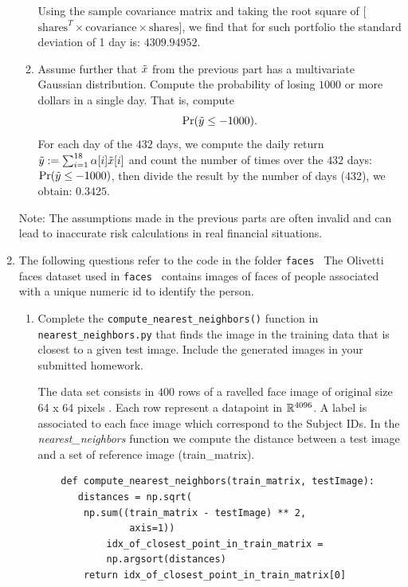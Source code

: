 \documentclass[12pt,twoside]{article}
\begin{document}
\begin{enumerate}
\begin{enumerate}
    Using the sample covariance matrix and taking the root square of [$ \text{shares}^T \times \text{covariance} \times \text{shares}$], we find that for such portfolio the standard deviation of 1 day is: $4309.94952$.
    
  \item Assume further that $\tilde{  x }$ from the previous part has a
    multivariate Gaussian distribution.  Compute the probability
    of losing $1000$ or more dollars in a single day.  That is,
    compute
    $$\Pr(\tilde{  y } \leq -1000).$$
    For each day of the $432$ days, we compute the daily return $\tilde{  y } := \sum_{i=1}^{18} \alpha[i] \tilde{  x }[i]$ and count the number of times over the $432$ days: $\Pr(\tilde{  y } \leq -1000)$, then divide the result by the number of days (432),
    we obtain: $0.3425$.
    
  \end{enumerate}
  Note: The assumptions made in the previous parts are often
  invalid and can lead to inaccurate risk calculations in real
  financial situations. 
  
  \newpage
  \item The following questions refer to the code in the folder {\tt faces }
  The Olivetti faces dataset used in  {\tt faces }  contains images of faces of people associated with a unique numeric id to identify the person.

  	\begin{enumerate}
		\item Complete the \verb|compute_nearest_neighbors()| function in \verb|nearest_neighbors.py| that finds the image in the training data that is closest to a given test image.  Include the generated images in your submitted homework.


		The data set consists in $400$ rows of a ravelled face image of original size 64 x 64 pixels . Each row represent a datapoint in $\mathbb{R}^{4096}$.
		A label is associated to each face image which correspond to the Subject IDs.
		In the \emph{nearest\_neighbors} function we compute the distance between a test image and a set of reference image (train\_matrix).

\begin{verbatim}
	def compute_nearest_neighbors(train_matrix, testImage):
	   distances = np.sqrt(
	   	np.sum((train_matrix - testImage) ** 2, 
	   			axis=1))
    	    idx_of_closest_point_in_train_matrix = 
	    	np.argsort(distances)
	    return idx_of_closest_point_in_train_matrix[0]
\end{verbatim}



\end{enumerate}
\end{enumerate}
\end{document}

